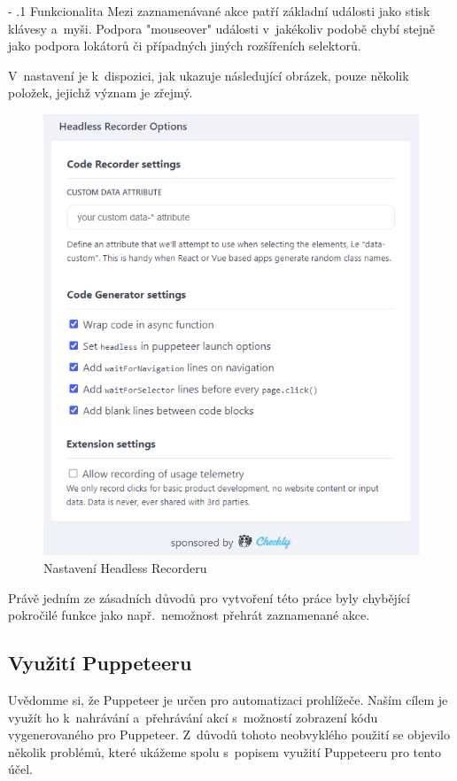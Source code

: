 \documentclass[12pt, a4paper, twoside]{article}
\makeatletter
\renewcommand\paragraph{%
	\@startsection{subparagraph}{5}{0mm}%
	{-\baselineskip}%
	{.1\baselineskip}%
	{\normalfont\normalsize\bfseries}}
\makeatother
\begin{document}
	\paragraph{Funkcionalita}
	Mezi zaznamenávané akce patří základní události jako stisk klávesy a~myši. Podpora "mouseover" události v~jakékoliv podobě chybí stejně jako podpora lokátorů či případných jiných rozšířeních selektorů.
	
	V~nastavení je k~dispozici, jak ukazuje následující obrázek, pouze několik položek, jejichž význam je zřejmý.
    \begin{figure}[H]
		\centering
		\includegraphics[width=1.0\textwidth]{headlessRecorderSettings.png}
		\caption{Nastavení Headless Recorderu}
	\end{figure}
	
	\noindent Právě jedním ze zásadních důvodů pro vytvoření této práce byly chybějící pokročilé funkce jako např.~nemožnost přehrát zaznamenané akce.
	\subsection{Využití Puppeteeru}
	\label{sub_sec:PuppeteerUsageForAutomation}
	Uvědomme si, že Puppeteer je určen pro automatizaci prohlížeče. Naším cílem je využít ho k~nahrávání a~přehrávání akcí s~možností zobrazení kódu vygenerovaného pro Puppeteer. Z~důvodů tohoto neobvyklého použití se objevilo několik problémů, které ukážeme spolu s~popisem využití Puppeteeru pro tento účel.
	
\end{document}
